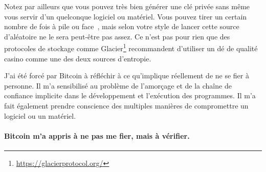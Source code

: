 Notez par ailleurs que vous pouvez très bien générer une clé privée sans même
vous servir d'un quelconque logiciel ou matériel. Vous pouvez tirer un certain
nombre de fois à pile ou face~\cite{antonopoulos2014mastering}, mais selon votre
style de lancer cette source d'aléatoire ne le sera peut-être pas assez. Ce
n'est pas pour rien que des protocoles de stockage comme
Glacier\footnote{\url{https://glacierprotocol.org/}} recommandent d'utiliser un
dé de qualité casino comme une des deux sources d'entropie.

J'ai été forcé par Bitcoin à réfléchir à ce qu'implique réellement de ne se fier
à personne. Il m'a sensibilisé au problème de l'amorçage et de la chaîne de
confiance implicite dans le développement et l'exécution des programmes. Il m'a
fait également prendre conscience des multiples manières de compromettre un
logiciel ou un matériel.

\paragraph{Bitcoin m'a appris à ne pas me fier, mais à vérifier.}

%
%
%
%
